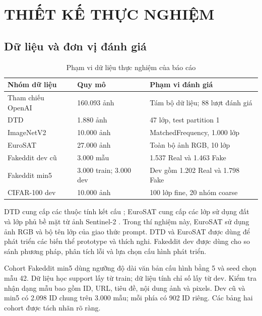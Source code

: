 \documentclass[12pt,a4paper]{article}
\newcommand{\BodySize}{13}
\newcommand{\BodyLeading}{15.6}
\newcommand{\BodyFont}{\fontsize{\BodySize}{\BodyLeading}\selectfont}
\newcommand{\Chapter}[1]{\clearpage\section{#1}}
\numberwithin{figure}{section}
\numberwithin{table}{section}
\numberwithin{equation}{section}
\begin{document}


\Chapter{THIẾT KẾ THỰC NGHIỆM}
\subsection{Dữ liệu và đơn vị đánh giá}
\begin{table}[H]\centering\BodyFont
\caption{Phạm vi dữ liệu thực nghiệm của báo cáo}
\begin{tabularx}{\linewidth}{@{}p{.25\linewidth}p{.20\linewidth}L@{}}\toprule
Nhóm dữ liệu & Quy mô & Phạm vi đánh giá\\\midrule
Tham chiếu OpenAI & 160.093 ảnh & Tám bộ dữ liệu; 88 lượt đánh giá\\
DTD & 1.880 ảnh & 47 lớp, test partition 1\\
ImageNetV2 & 10.000 ảnh & MatchedFrequency, 1.000 lớp\\
EuroSAT & 27.000 ảnh & Toàn bộ ảnh RGB, 10 lớp\\
Fakeddit dev cũ & 3.000 mẫu & 1.537 Real và 1.463 Fake\\
Fakeddit min5 & 3.000 train; 3.000 dev & Dev gồm 1.202 Real và 1.798 Fake\\
CIFAR-100 dev & 10.000 ảnh & 100 lớp fine, 20 nhóm coarse\\\bottomrule
\end{tabularx}\label{tab:datasets}
\end{table}

DTD cung cấp các thuộc tính kết cấu \cite{dtd}; EuroSAT cung cấp các lớp sử dụng đất và lớp phủ bề mặt từ ảnh Sentinel-2 \cite{eurosat}. Trong thí nghiệm này, EuroSAT sử dụng ảnh RGB và bộ tên lớp của giao thức prompt. DTD và EuroSAT được dùng để phát triển các biến thể prototype và thích nghi. Fakeddit dev được dùng cho so sánh phương pháp, phân tích lỗi và lựa chọn cấu hình phát triển.

Cohort Fakeddit min5 dùng ngưỡng độ dài văn bản cấu hình bằng 5 và seed chọn mẫu 42. Dữ liệu học support lấy từ train; dữ liệu tính chỉ số lấy từ dev. Kiểm tra nhận dạng mẫu bao gồm ID, URL, tiêu đề, nội dung ảnh và pixels. Dev cũ và min5 có 2.098 ID chung trên 3.000 mẫu; mỗi phía có 902 ID riêng. Các bảng hai cohort được tách nhãn rõ ràng.
\end{document}
